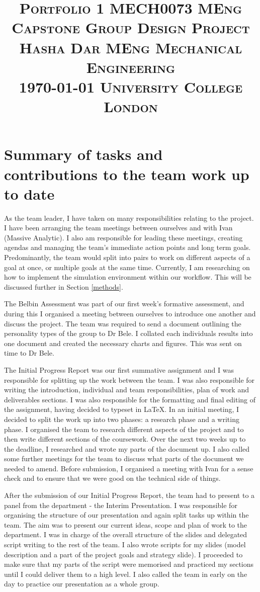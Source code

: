 \documentclass[10pt]{article}
\title{
    \textsc{\huge Portfolio 1 }\hfill \textsc{\large MECH0073 MEng Capstone Group Design Project}\\%
    \textsc{\large Hasha Dar} \hfill \textsc{\large MEng Mechanical Engineering }\\
    \textsc{\large \today} \hfill \textsc{\large University College London }
}
\date{}
\begin{document}
\maketitle
\section{Summary of tasks and contributions to the team work up to date}
As the team leader, I have taken on many responsibilities relating to the project. I have been arranging the team meetings between ourselves and with Ivan (Massive Analytic). I also am responsible for leading these meetings, creating agendas and managing the team's immediate action points and long term goals. Predominantly, the team would split into pairs to work on different aspects of a goal at once, or multiple goals at the same time. Currently, I am researching on how to implement the simulation environment within our workflow. This will be discussed further in Section \ref{methods}. 

The Belbin Assessment was part of our first week's formative assessment, and during this I organised a meeting between ourselves to introduce one another and discuss the project. The team was required to send a document outlining the personality types of the group to Dr Bele. I collated each individuals results into one document and created the necessary charts and figures. This was sent on time to Dr Bele. 

The Initial Progress Report was our first summative assignment and I was responsible for splitting up the work between the team. I was also responsible for writing the introduction, individual and team responsibilities, plan of work and deliverables sections. I was also responsible for the formatting and final editing of the assignment, having decided to typeset in \LaTeX. In an initial meeting, I decided to split the work up into two phases: a research phase and a writing phase. I organised the team to research different aspects of the project and to then write different sections of the coursework. Over the next two weeks up to the deadline, I researched and wrote my parts of the document up. I also called some further meetings for the team to discuss what parts of the document we needed to amend. Before submission, I organised a meeting with Ivan for a sense check and to ensure that we were good on the technical side of things. 

After the submission of our Initial Progress Report, the team had to present to a panel from the department - the Interim Presentation. I was responsible for organising the structure of our presentation and again split tasks up within the team. The aim was to present our current ideas, scope and plan of work to the department. I was in charge of the overall structure of the slides and delegated script writing to the rest of the team. I also wrote scripts for my slides (model description and a part of the project goals and strategy slide). I proceeded to make sure that my parts of the script were memorised and practiced my sections until I could deliver them to a high level. I also called the team in early on the day to practice our presentation as a whole group. 
\end{document}
